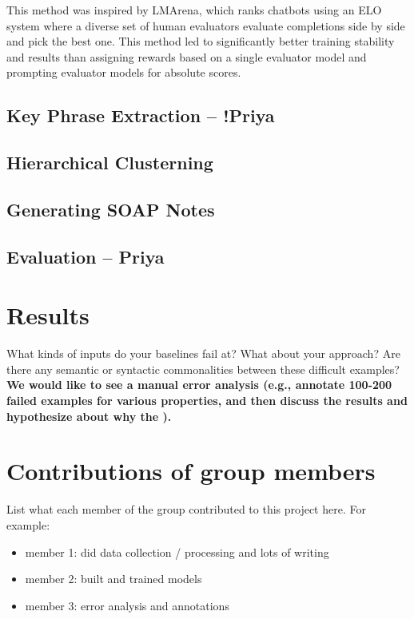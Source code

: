 \documentclass[11pt,a4paper]{article}
\begin{document}
This method was inspired by LMArena, which ranks chatbots using an ELO system where a diverse set of human evaluators evaluate completions side by side and pick the best one. This method led to significantly better training stability and results than assigning rewards based on a single evaluator model and prompting evaluator models for absolute scores. 

\subsection{Key Phrase Extraction -- !Priya}

\subsection{Hierarchical Clusterning}

\subsection{Generating SOAP Notes}

\subsection{Evaluation -- Priya}


\section{Results}
What kinds of inputs do your baselines fail at? What about your approach? Are there any semantic or syntactic commonalities between these difficult examples? \textbf{We would like to see a manual error analysis (e.g., annotate 100-200 failed examples for various properties, and then discuss the results and hypothesize about why the ).} 

\section{Contributions of group members}
List what each member of the group contributed to this project here. For example: 
\begin{itemize}
    \item member 1: did data collection / processing and lots of writing
    \item member 2: built and trained models
    \item member 3: error analysis and annotations
\end{itemize}
\end{document}
